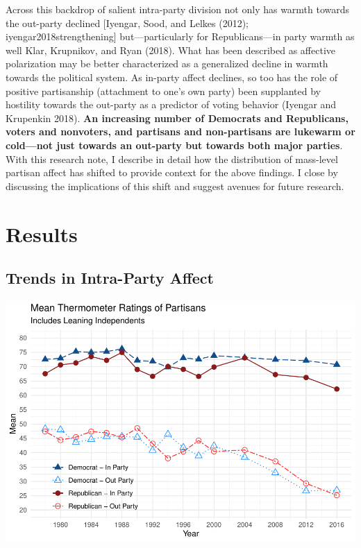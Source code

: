 \documentclass[
  12,
]{paper}
\begin{document}
Across this backdrop of salient intra-party division not only has warmth
towards the out-party declined {[}Iyengar, Sood, and Lelkes (2012);
iyengar2018strengthening{]} but---particularly for Republicans---in
party warmth as well Klar, Krupnikov, and Ryan (2018). What has been
described as affective polarization may be better characterized as a
generalized decline in warmth towards the political system. As in-party
affect declines, so too has the role of positive partisanship
(attachment to one's own party) been supplanted by hostility towards the
out-party as a predictor of voting behavior (Iyengar and Krupenkin
2018). \textbf{An increasing number of Democrats and Republicans, voters
and nonvoters, and partisans and non-partisans are lukewarm or
cold---not just towards an out-party but towards both major parties}.
With this research note, I describe in detail how the distribution of
mass-level partisan affect has shifted to provide context for the above
findings. I close by discussing the implications of this shift and
suggest avenues for future research.

\hypertarget{results}{%
\section{Results}\label{results}}

\hypertarget{trends-in-intra-party-affect}{%
\subsection{Trends in Intra-Party
Affect}\label{trends-in-intra-party-affect}}

\includegraphics{intra-party-note_files/figure-latex/unnamed-chunk-2-1.pdf}
\end{document}
